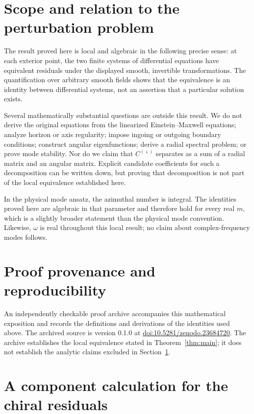 \documentclass[11pt,a4paper]{article}
\numberwithin{equation}{section}
\theoremstyle{definition}
\theoremstyle{remark}
\begin{document}
\section{Scope and relation to the perturbation problem}
\label{sec:scope}

The result proved here is local and algebraic in the following precise
sense: at each exterior point, the two finite systems of differential
equations have equivalent residuals under the displayed smooth,
invertible transformations.  The quantification over arbitrary smooth
fields shows that the equivalence is an identity between differential
systems, not an assertion that a particular solution exists.

Several mathematically substantial questions are outside this result.
We do not derive the original equations from the linearized
Einstein--Maxwell equations; analyze horizon or axis regularity; impose
ingoing or outgoing boundary conditions; construct angular eigenfunctions;
derive a radial spectral problem; or prove mode stability.  Nor do we
claim that \(C^{(\varsigma)}\) separates as a sum of a radial matrix and
an angular matrix.  Explicit candidate coefficients for such a
decomposition can be written down, but proving that decomposition is not
part of the local equivalence established here.

In the physical mode ansatz, the azimuthal number is integral.  The
identities proved here are algebraic in that parameter and therefore hold
for every real \(m\), which is a slightly broader statement than the
physical mode convention.  Likewise, \(\omega\) is real throughout this
local result; no claim about complex-frequency modes follows.

\section{Proof provenance and reproducibility}
\label{sec:provenance}

An independently checkable proof archive \cite{Wang2026} accompanies this mathematical
exposition and records the definitions and derivations of the identities
used above.  The archived source is version 0.1.0 at
\href{https://doi.org/10.5281/zenodo.23684720}{doi:10.5281/zenodo.23684720}.
The archive establishes the local equivalence stated in
Theorem~\ref{thm:main}; it does not establish the analytic claims excluded
in Section~\ref{sec:scope}.

\appendix
\section{A component calculation for the chiral residuals}
\label{app:component}
\end{document}
